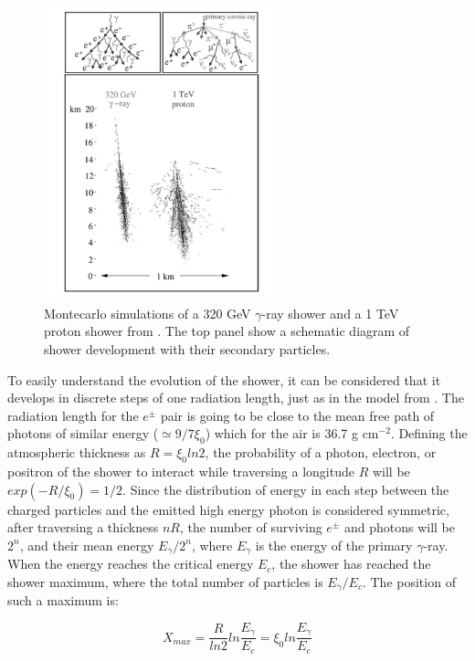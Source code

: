 \documentclass[main.tex]{subfiles}
\begin{document}
\begin{figure}[h]
  \centering
  \includegraphics[width=0.6\textwidth]{Pictures/eas.pdf}
  \caption{Montecarlo simulations of a 320 GeV $\gamma$-ray shower and a 1 TeV proton shower from \cite{weekes2003HEAstrophy}. The top panel show a schematic diagram of shower development with their secondary particles.}
  \label{fig:EAS}
\end{figure}

To easily understand the evolution of the shower, it can be considered that it develops in discrete steps of one radiation length, just as in the model from \cite{1954Heitler}. The radiation length for the $e^\pm$ pair is going to be close to the mean free path of photons of similar energy ($\simeq 9/7 \xi_{0}$) which for the air is 36.7 g cm$^{-2}$. Defining the atmospheric thickness as $R=\xi_{0}ln2$, the probability of a photon, electron, or positron of the shower to interact while traversing a longitude $R$ will be $exp(-R/\xi_{0}) = 1/2$. Since the distribution of energy in each step between the charged particles and the emitted high energy photon is considered symmetric, after traversing a thickness $nR$, the number of surviving $e^\pm$ and photons will be $2^n$, and their mean energy $E_{\gamma}/2^{n}$, where $E_\gamma$ is the energy of the primary $\gamma$-ray. When the energy reaches the critical energy $E_c$, the shower has reached the shower maximum, where the total number of particles is $E_{\gamma}/E_c$. The position of such a maximum is:

\begin{equation} \label{eq:xmax}
  X_{max} = \frac{R}{ln 2} ln \frac{E_{\gamma}}{E_c} = \xi_0 ln \frac{E_{\gamma}}{E_c}
\end{equation}
\end{document}
